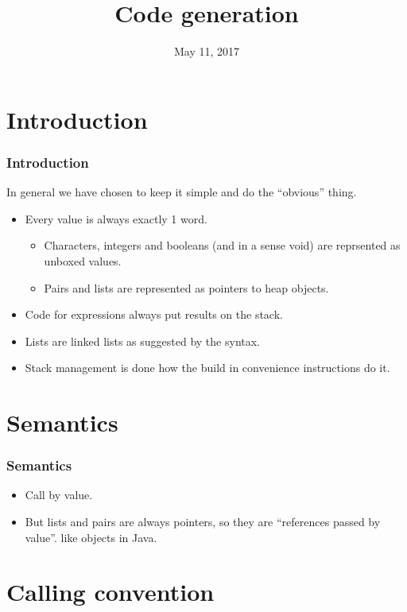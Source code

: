 \documentclass{beamer}
\title{Code generation}
\date{May 11, 2017}
\begin{document}
\maketitle

\section{Introduction}

\begin{frame}
\frametitle{Introduction}
In general we have chosen to keep it simple and do the ``obvious'' thing.
\begin{itemize}
\item Every value is always exactly 1 word.
 \begin{itemize}
 \item Characters, integers and booleans (and in a sense void) are reprsented as unboxed values.
 \item Pairs and lists are represented as pointers to heap objects.
 \end{itemize}
\item Code for expressions always put results on the stack.
\item Lists are linked lists as suggested by the syntax.
\item Stack management is done how the build in convenience instructions do it.
\end{itemize}
\end{frame}

\section{Semantics}

\begin{frame}
\frametitle{Semantics}

\begin{itemize}
\item Call by value.
\item But lists and pairs are always pointers, so they are ``references passed by value''.
        like objects in Java.
\end{itemize}
\end{frame}

\section{Calling convention}
\end{document}
